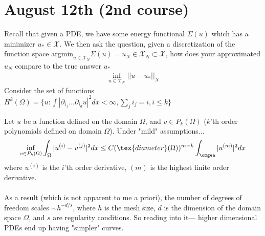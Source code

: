 \section{August 12th (2nd course)}
Recall that given a PDE, we have some energy functional $\Sigma(u)$ which has a minimizer $u_* \in \mathcal X$. We then ask the question, given a discretization of the function space $\text{argmin}_{u \in \mathcal X_N} \Sigma(u) = u_N \in \mathcal X_N \subset \mathcal X$, how does your approximated $u_N$ compare to the true answer $u_*$
\begin{align}
	\inf_{u \in \mathcal X_N}||u-u_*||_X
\end{align}
Consider the set of functions $H^k(\Omega) = \{u : \int |\partial_{i_1} ... \partial_{i_d} u|^2 d x < \infty, \sum_j i_j = i, i \leq k\}$

\begin{theorem}
	 Let $u$ be a function defined on the domain $\Omega$, and $v \in P_k(\Omega)$ ($k$'th order polynomials defined on domain $\Omega$). Under "mild" assumptions...
	\begin{align}
		\inf_{v \in P_k(\Omega)} \int_\Omega |u^{(i)} - v^{(j)}|^2 dx \leq C (\tex{diameter}(\Omega))^{m-k} \int_\omgea |u^{(m)}|^2 dx
	\end{align}
	where $u^{(i)}$ is the $i$'th order derivative, $(m)$ is the highest finite order derivative.\\
	\\
	As a result (which is not apparent to me a priori), the number of degrees of freedom scales $\sim h^{-d/s}$, where $h$ is the mesh size, $d$ is the dimension of the domain space $\Omega$, and $s$ are regularity conditions. So reading into it--- higher dimensional PDEs end up having "simpler" curves.
\end{theorem}














































